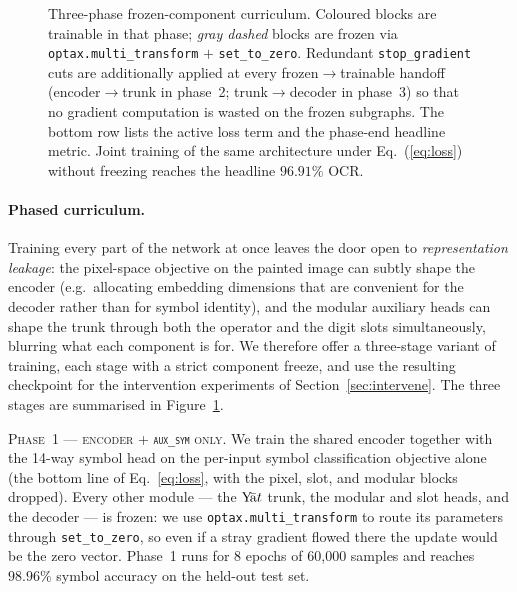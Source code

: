 \documentclass[11pt]{article}
\theoremstyle{papsty}
\newcommand{\yat}{$\textnormal{Y}\!\bar{\text{a}}t$}
\begin{document}
\begin{figure}[t]
{%
  }
  \caption{Three-phase frozen-component curriculum.
    Coloured blocks are trainable in that phase; \emph{gray dashed}
    blocks are frozen via \texttt{optax.multi\_transform} $+$
    \texttt{set\_to\_zero}. Redundant \texttt{stop\_gradient} cuts are
    additionally applied at every frozen$\!\to\!$trainable handoff
    (encoder$\to$trunk in phase~2; trunk$\to$decoder in phase~3) so
    that no gradient computation is wasted on the frozen subgraphs.
    The bottom row lists the active loss term and the phase-end
    headline metric. Joint training of the same architecture under
    Eq.~(\ref{eq:loss}) without freezing reaches the headline
    $96.91\%$ OCR.}
  \label{fig:phases}
\end{figure}

\paragraph{Phased curriculum.}
\label{sec:phased}
Training every part of the network at once leaves the door open to
\emph{representation leakage}: the pixel-space objective on the painted
image can subtly shape the encoder (e.g.\ allocating embedding
dimensions that are convenient for the decoder rather than for symbol
identity), and the modular auxiliary heads can shape the trunk through
both the operator and the digit slots simultaneously, blurring what
each component is for.
We therefore offer a three-stage variant of training, each stage with a
strict component freeze, and use the resulting checkpoint for the
intervention experiments of Section~\ref{sec:intervene}. The three
stages are summarised in Figure~\ref{fig:phases}.

\textsc{Phase~1 — encoder + \texttt{aux\_sym} only.}
We train the shared encoder together with the 14-way symbol head on
the per-input symbol classification objective alone
(the bottom line of Eq.~\ref{eq:loss}, with the pixel, slot, and
modular blocks dropped).
Every other module — the \yat{} trunk, the modular and slot heads, and
the decoder — is frozen: we use \texttt{optax.multi\_transform} to
route its parameters through \texttt{set\_to\_zero}, so even if a stray
gradient flowed there the update would be the zero vector.
Phase~1 runs for 8 epochs of 60{,}000 samples and reaches $98.96\%$
symbol accuracy on the held-out test set.
\end{document}
